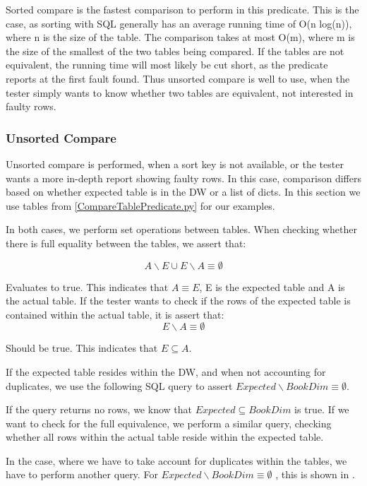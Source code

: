 Sorted compare is the fastest comparison to perform in this predicate. This is the case, as sorting with SQL generally has an average running time of O(n log(n)), where n is the size of the table. The comparison takes at most O(m), where m is the size of the smallest of the two tables being compared. If the tables are not equivalent, the running time will most likely be cut short, as the predicate reports at the first fault found. Thus unsorted compare is well to use, when the tester simply wants to know whether two tables are equivalent, not interested in faulty rows.



\subsubsection{Unsorted Compare}
Unsorted compare is performed, when a sort key is not available, or the tester wants a more in-depth report showing faulty rows. In this case, comparison differs based on whether expected table is in the DW or a list of dicts. In this section we use tables from \cref{CompareTablePredicate.py} for our examples.

In both cases, we perform set operations between tables. When checking whether there is full equality between the tables, we assert that:

\[ A \backslash E \cup E \backslash A \equiv \emptyset \]

Evaluates to true. This indicates that $A \equiv E$, E is the expected table and A is the actual table. If the tester wants to check if the rows of the expected table is contained within the actual table, it is assert that:
\[ E \backslash A \equiv \emptyset \]

Should be true. This indicates that $E \subseteq A$.

If the expected table resides within the DW, and when not accounting for duplicates, we use the following SQL query to assert $Expected \backslash BookDim \equiv \emptyset $.


If the query returns no rows, we know that $Expected \subseteq BookDim$ is true. If we want to check for the full equivalence, we perform a similar query, checking whether all rows within the actual table reside within the expected table.

In the case, where we have to take account for duplicates within the tables, we have to perform another query. For $Expected \backslash BookDim \equiv \emptyset$ , this is shown in .

